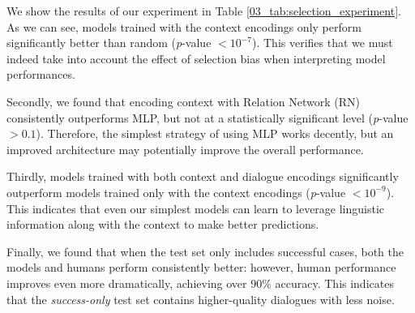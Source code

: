 \begin{table}[t!]
\centering {}
\caption{\label{03_tab:selection_experiment}
Results of the target selection task.
}
\end{table}

We show the results of our experiment in Table \ref{03_tab:selection_experiment}. As we can see, models trained with the context encodings only perform significantly better than random (\textit{p}-value $<10^{-7}$). This verifies that we must indeed take into account the effect of selection bias when interpreting model performances.

Secondly, we found that encoding context with Relation Network (RN) consistently outperforms MLP, but not at a statistically significant level (\textit{p}-value $>0.1$). Therefore, the simplest strategy of using MLP works decently, but an improved architecture may potentially improve the overall performance.

Thirdly, models trained with both context and dialogue encodings significantly outperform models trained only with the context encodings (\textit{p}-value $<10^{-9}$). This indicates that even our simplest models can learn to leverage linguistic information along with the context to make better predictions.

Finally, we found that when the test set only includes successful cases, both the models and humans perform consistently better: however, human performance improves even more dramatically, achieving over 90\% accuracy. This indicates that the \textit{success-only} test set contains higher-quality dialogues with less noise.

